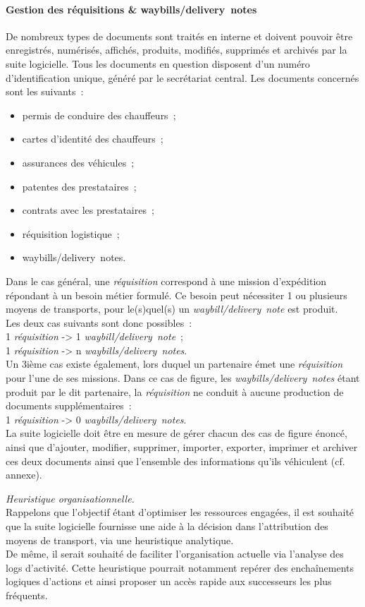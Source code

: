 \paragraph{Gestion des réquisitions \& waybills/delivery~notes}
De nombreux types de documents sont traités en interne et doivent pouvoir être enregistrés, numérisés, affichés, produits, modifiés, supprimés et archivés par la suite logicielle. Tous les documents en question disposent d'un numéro d'identification unique, généré par le secrétariat central. Les documents concernés sont les suivants~:
\begin{itemize}
	\item permis de conduire des chauffeurs~;
	\item cartes d'identité des chauffeurs~;
	\item assurances des véhicules~;
	\item patentes des prestataires~;
	\item contrats avec les prestataires~;
	\item réquisition logistique~;
	\item waybills/delivery~notes.
\end{itemize}
Dans le cas général, une \emph{réquisition} correspond à une mission d'expédition répondant à un besoin métier formulé. Ce besoin peut nécessiter 1 ou plusieurs moyens de transports, pour le(s)quel(s) un \emph{waybill/delivery~note} est produit.
\\
Les deux cas suivants sont donc possibles~:
\\
1 \emph{réquisition} -> 1 \emph{waybill/delivery~note}~;
\\
1 \emph{réquisition} -> n \emph{waybills/delivery~notes}.
\\
Un 3ième cas existe également, lors duquel un partenaire émet une \emph{réquisition} pour l'une de ses missions. Dans ce cas de figure, les \emph{waybills/delivery~notes} étant produit par le dit partenaire, la \emph{réquisition} ne conduit à aucune production de documents supplémentaires~:
\\
1 \emph{réquisition} -> 0 \emph{waybills/delivery~notes}.
\\
La suite logicielle doit être en mesure de gérer chacun des cas de figure énoncé, ainsi que d'ajouter, modifier, supprimer, importer, exporter, imprimer et archiver ces deux documents ainsi que l'ensemble des informations qu'ils véhiculent (cf. annexe).
\\
\begin{notation}
\emph{Heuristique organisationnelle.}
\\
Rappelons que l'objectif étant d'optimiser les ressources engagées, il est souhaité que la suite logicielle fournisse une aide à la décision dans l'attribution des moyens de transport, via une heuristique analytique.
\\
De même, il serait souhaité de faciliter l'organisation actuelle via l'analyse des logs d'activité. Cette heuristique pourrait notamment repérer des enchaînements logiques d'actions et ainsi proposer un accès rapide aux successeurs les plus fréquents.
\end{notation}

